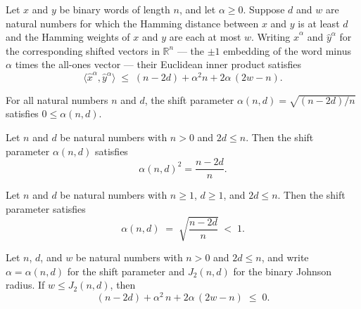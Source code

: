 \begin{lemma}
\label{CodingTheory.Johnson.inner_shifted_le_expr}
\leanok
{}
Let $x$ and $y$ be binary words of length $n$, and let $\alpha \ge 0$. Suppose $d$ and
$w$ are natural numbers for which the Hamming distance between $x$ and $y$ is at least
$d$ and the Hamming weights of $x$ and $y$ are each at most $w$. Writing
$\hat{x}^\alpha$ and $\hat{y}^\alpha$ for the corresponding shifted vectors in
$\mathbb{R}^n$ — the $\pm 1$ embedding of the word minus $\alpha$ times the all-ones
vector — their Euclidean inner product satisfies
\[
\langle \hat{x}^\alpha, \hat{y}^\alpha \rangle \;\le\; (n - 2d) + \alpha^2 n +
2\alpha\,(2w - n).
\]
\end{lemma}

\begin{lemma}
\label{CodingTheory.Johnson.alpha_nonneg}
\leanok
{}
For all natural numbers $n$ and $d$, the shift parameter $\alpha(n,d) = \sqrt{(n -
2d)/n}$ satisfies $0 \le \alpha(n,d)$.
\end{lemma}

\begin{lemma}
\label{CodingTheory.Johnson.alpha_sq}
\leanok
{}
Let $n$ and $d$ be natural numbers with $n > 0$ and $2d \le n$. Then the shift parameter
$\alpha(n,d)$ satisfies
\[
\alpha(n,d)^2 = \frac{n - 2d}{n}.
\]
\end{lemma}

\begin{lemma}
\label{CodingTheory.Johnson.alpha_lt_one_of_hd1}
\leanok
{}
Let $n$ and $d$ be natural numbers with $n \ge 1$, $d \ge 1$, and $2d \le n$. Then the
shift parameter satisfies
\[
\alpha(n,d) \;=\; \sqrt{\frac{n - 2d}{n}} \;<\; 1.
\]
\end{lemma}

\begin{lemma}
\label{CodingTheory.Johnson.johnson_arith}
\leanok
{}
Let $n$, $d$, and $w$ be natural numbers with $n > 0$ and $2d \le n$, and write $\alpha
= \alpha(n,d)$ for the shift parameter and $J_2(n,d)$ for the binary Johnson radius. If
$w \le J_2(n,d)$, then
\[
(n - 2d) + \alpha^2\, n + 2\alpha\,(2w - n) \;\le\; 0.
\]
\end{lemma}

